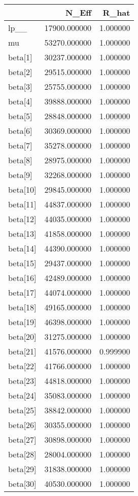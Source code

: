 \begin{tabular}{lrr}
\toprule
 & N_Eff & R_hat \\
\midrule
lp__ & 17900.000000 & 1.000000 \\
mu & 53270.000000 & 1.000000 \\
beta[1] & 30237.000000 & 1.000000 \\
beta[2] & 29515.000000 & 1.000000 \\
beta[3] & 25755.000000 & 1.000000 \\
beta[4] & 39888.000000 & 1.000000 \\
beta[5] & 28848.000000 & 1.000000 \\
beta[6] & 30369.000000 & 1.000000 \\
beta[7] & 35278.000000 & 1.000000 \\
beta[8] & 28975.000000 & 1.000000 \\
beta[9] & 32268.000000 & 1.000000 \\
beta[10] & 29845.000000 & 1.000000 \\
beta[11] & 44837.000000 & 1.000000 \\
beta[12] & 44035.000000 & 1.000000 \\
beta[13] & 41858.000000 & 1.000000 \\
beta[14] & 44390.000000 & 1.000000 \\
beta[15] & 29437.000000 & 1.000000 \\
beta[16] & 42489.000000 & 1.000000 \\
beta[17] & 44074.000000 & 1.000000 \\
beta[18] & 49165.000000 & 1.000000 \\
beta[19] & 46398.000000 & 1.000000 \\
beta[20] & 31275.000000 & 1.000000 \\
beta[21] & 41576.000000 & 0.999900 \\
beta[22] & 41766.000000 & 1.000000 \\
beta[23] & 44818.000000 & 1.000000 \\
beta[24] & 35083.000000 & 1.000000 \\
beta[25] & 38842.000000 & 1.000000 \\
beta[26] & 30355.000000 & 1.000000 \\
beta[27] & 30898.000000 & 1.000000 \\
beta[28] & 28004.000000 & 1.000000 \\
beta[29] & 31838.000000 & 1.000000 \\
beta[30] & 40530.000000 & 1.000000 \\

\end{tabular}
